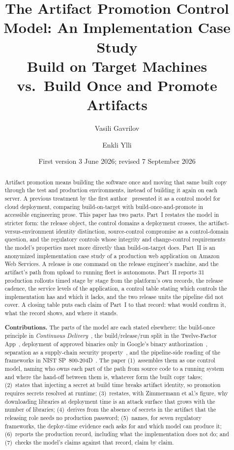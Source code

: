 \documentclass[11pt]{article}
\title{The Artifact Promotion Control Model: An Implementation Case Study\\
\large Build on Target Machines vs.\ Build Once and Promote Artifacts}
\author{Vasili Gavrilov \and Enkli Ylli}
\date{First version 3 June 2026; revised 7 September 2026}
\begin{document}
\maketitle

\begin{abstract}
Artifact promotion means building the software once and moving that same built copy through the test and production environments, instead of building it again on each server. A previous treatment by the first author~\cite{ControlModel} presented it as a control model for cloud deployment, comparing build-on-target with build-once-and-promote in accessible engineering prose. This paper has two parts. Part~I restates the model in stricter form: the release object, the control domains a deployment crosses, the artifact-versus-environment identity distinction, source-control compromise as a control-domain question, and the regulatory controls whose integrity and change-control requirements the model's properties meet more directly than build-on-target does. Part~II is an anonymized implementation case study of a production web application on Amazon Web Services. A release is one command on the release engineer's machine, and the artifact's path from upload to running fleet is autonomous. Part~II reports 31 production rollouts timed stage by stage from the platform's own records, the release cadence, the service levels of the application, a control table stating which controls the implementation has and which it lacks, and the two release units the pipeline did not cover. A closing table puts each claim of Part~I to that record: what would confirm it, what the record shows, and where it stands.

\textbf{Contributions.} The parts of the model are each stated elsewhere: the build-once principle in \emph{Continuous Delivery}~\cite{ContinuousDelivery}, the build/release/run split in the Twelve-Factor App~\cite{TwelveFactor}, deployment of approved binaries only in Google's binary authorization~\cite{BAB,BSRS}, separation as a supply-chain security property~\cite{Okafor}, and the pipeline-side reading of the frameworks in NIST SP~800-204D~\cite{NIST800204D}. The paper (1)~assembles them as one control model, naming who owns each part of the path from source code to a running system and where the hand-off between them is, whatever form the built copy takes; (2)~states that injecting a secret at build time breaks artifact identity, so promotion requires secrets resolved at runtime; (3)~restates, with Zimmermann et al.'s figure, why downloading libraries at deployment time is an attack surface that grows with the number of libraries; (4)~derives from the absence of secrets in the artifact that the releasing role needs no production password; (5)~names, for seven regulatory frameworks, the deploy-time evidence each asks for and which model can produce it; (6)~reports the production record, including what the implementation does not do; and (7)~checks the model's claims against that record, claim by claim.
\end{abstract}
\end{document}
